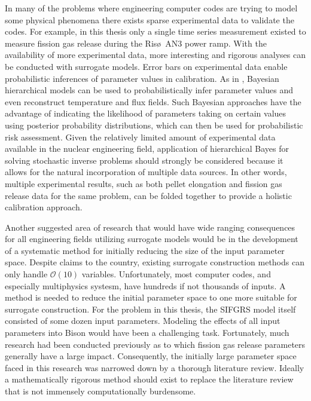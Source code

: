 In many of the problems where engineering computer codes are trying to model some physical phenomena there exists sparse experimental data to validate the codes. For example, in this thesis only a single time series measurement existed to measure fission gas release during the Ris\o~AN3 power ramp. With the availability of more experimental data, more interesting and rigorous analyses can be conducted with surrogate models. Error bars on experimental data enable probabilistic inferences of parameter values in calibration. As in \cite{Wang}, Bayesian hierarchical models can be used to probabilistically infer parameter values and even reconstruct temperature and flux fields. Such Bayesian approaches have the advantage of indicating the likelihood of parameters taking on certain values using posterior probability distributions, which can then be used for probabilistic risk assessment. Given the relatively limited amount of experimental data available in the nuclear engineering field, application of hierarchical Bayes for solving stochastic inverse problems should strongly be considered because it allows for the natural incorporation of multiple data sources. In other words, multiple experimental results, such as both pellet elongation and fission gas release data for the same problem, can be folded together to provide a holistic calibration approach.     

Another suggested area of research that would have wide ranging consequences for all engineering fields utilizing surrogate models would be in the development of a systematic method for initially reducing the size of the input parameter space. Despite claims to the country, existing surrogate construction methods can only handle $\mathcal{O}(10)$ variables. Unfortunately, most computer codes, and especially multiphysics systesm, have hundreds if not thousands of inputs. A method is needed to reduce the initial parameter space to one more suitable for surrogate construction. For the problem in this thesis, the \ac{SIFGRS} model itself consisted of some dozen input parameters. Modeling the effects of all input parameters into Bison would have been a challenging task. Fortunately, much research had been conducted previously as to which fission gas release parameters generally have a large impact. Consequently, the initially large parameter space faced in this research was narrowed down by a thorough literature review. Ideally a mathematically rigorous method should exist to replace the literature review that is not immensely computationally burdensome.  

